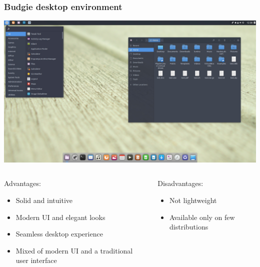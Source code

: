 \begin{frame}
	\frametitle{Budgie desktop environment}
	
	\begin{center}
		\includegraphics[width=.7\linewidth]{../graphics/desktop_examples/budgie.jpg}
	\end{center}%
	
	\vspace{-\baselineskip}
	
	\begin{columns}
		\begin{column}[t]{.7\linewidth}
			\begin{exampleblock}{Advantages:}
				\begin{itemize}
					\item Solid and intuitive
					\item Modern UI and elegant looks
					\item Seamless desktop experience
					\item Mixed of modern UI and a traditional user interface
				\end{itemize}
			\end{exampleblock}
		\end{column}
		\hfill
		\begin{column}[t]{.28\linewidth}
			\begin{alertblock}{Disadvantages:}
				\begin{itemize}
					\item Not lightweight
					\item Available only on few distributions
				\end{itemize}
			\end{alertblock}
		\end{column}
	\end{columns}
	\hfill
\end{frame}
